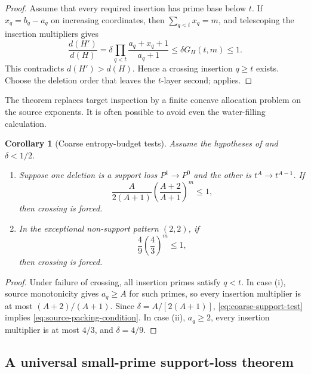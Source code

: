 \documentclass[11pt]{article}
\numberwithin{equation}{section}
\theoremstyle{blueplain}
\newtheorem{corollary}[theorem]{Corollary}
\theoremstyle{bluedef}
\begin{document}
\begin{proof}
Assume that every required insertion has prime base below $t$.  If $x_q=b_q-a_q$ on increasing coordinates, then $\sum_{q<t}x_q=m$, and telescoping the insertion multipliers gives
\[
 \frac{d(H')}{d(H)}
 =\delta\prod_{q<t}\frac{a_q+x_q+1}{a_q+1}
 \le\delta G_H(t,m)\le1.
\]
This contradicts $d(H')>d(H)$.  Hence a crossing insertion $q\ge t$ exists.  Choose the deletion order that leaves the $t$-layer second;  applies.
\end{proof}

The theorem replaces target inspection by a finite concave allocation problem on the source exponents.  It is often possible to avoid even the water-filling calculation.

\begin{corollary}[Coarse entropy-budget tests]
\label{cor:coarse-packing}
Assume the hypotheses of  and $\delta<1/2$.

\begin{enumerate}[label=\textup{(\roman*)}]
\item Suppose one deletion is a support loss $P^1\to P^0$ and the other is $t^A\to t^{A-1}$.  If
\begin{equation}
 \frac{A}{2(A+1)}
 \left(\frac{A+2}{A+1}\right)^m\le1,
 \label{eq:coarse-support-test}
\end{equation}
then crossing is forced.

\item In the exceptional non-support pattern $(2,2)$, if
\begin{equation}
 \frac49\left(\frac43\right)^m\le1,
 \label{eq:coarse-22-test}
\end{equation}
then crossing is forced.
\end{enumerate}
\end{corollary}

\begin{proof}
Under failure of crossing, all insertion primes satisfy $q<t$.  In case (i), source monotonicity gives $a_q\ge A$ for such primes, so every insertion multiplier is at most $(A+2)/(A+1)$.  Since $\delta=A/[2(A+1)]$, \eqref{eq:coarse-support-test} implies \eqref{eq:source-packing-condition}.  In case (ii), $a_q\ge2$, every insertion multiplier is at most $4/3$, and $\delta=4/9$.
\end{proof}

\subsection{A universal small-prime support-loss theorem}
\end{document}

